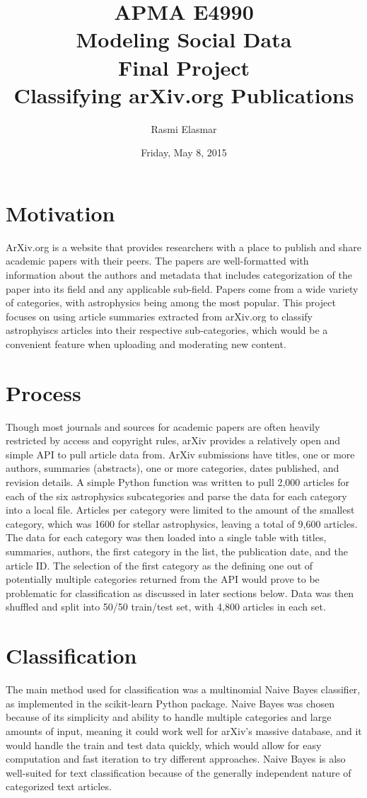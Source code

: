 \documentclass[]{article}
\begin{document}
\title{APMA E4990 \\ Modeling Social Data \\ Final Project \\ Classifying arXiv.org Publications}
\author{Rasmi Elasmar}
\date{Friday, May 8, 2015}
\maketitle
\section*{Motivation}
ArXiv.org is a website that provides researchers with a place to publish and share academic papers with their peers. The papers are well-formatted with information about the authors and metadata that includes categorization of the paper into its field and any applicable sub-field. Papers come from a wide variety of categories, with astrophysics being among the most popular. This project focuses on using article summaries extracted from arXiv.org to classify astrophyiscs articles into their respective sub-categories, which would be a convenient feature when uploading and moderating new content.
\section*{Process}
Though most journals and sources for academic papers are often heavily restricted by access and copyright rules, arXiv provides a relatively open and simple API to pull article data from. ArXiv submissions have titles, one or more authors, summaries (abstracts), one or more categories, dates published, and revision details. A simple Python function was written to pull 2,000 articles for each of the six astrophysics subcategories and parse the data for each category into a local file. Articles per category were limited to the amount of the smallest category, which was 1600 for stellar astrophysics, leaving a total of 9,600 articles. The data for each category was then loaded into a single table with titles, summaries, authors, the first category in the list, the publication date, and the article ID. The selection of the first category as the defining one out of potentially multiple categories returned from the API would prove to be problematic for classification as discussed in later sections below. Data was then shuffled and split into 50/50 train/test set, with 4,800 articles in each set.
\section*{Classification}
The main method used for classification was a multinomial Naive Bayes classifier, as implemented in the scikit-learn Python package. Naive Bayes was chosen because of its simplicity and ability to handle multiple categories and large amounts of input, meaning it could work well for arXiv's massive database, and it would handle the train and test data quickly, which would allow for easy computation and fast iteration to try different approaches. Naive Bayes is also well-suited for text classification because of the generally independent nature of categorized text articles.
\end{document}
